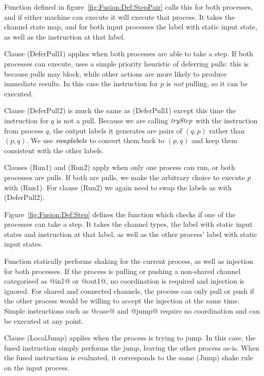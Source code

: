 

Function  defined in figure~\ref{fig:Fusion:Def:StepPair} calls this for both processes, and if either machine can execute it will execute that process.
It takes the channel state map, and for both input processes the label with static input state, as well as the instruction at that label.

Clause (DeferPull1) applies when both processes are able to take a step.
If both processes can execute,  uses a simple priority heuristic of deferring pulls: this is because pulls may block, while other actions are more likely to produce immediate results.
In this case the instruction for $p$ is \emph{not} pulling, so it can be executed.

Clause (DeferPull2) is much the same as (DeferPull1) except this time the instruction for $q$ is not a pull.
Because we are calling $\textit{tryStep}$ with the instruction from process $q$, the output labels it generates are pairs of $(q,p)$ rather than $(p,q)$.
We use $\textit{swaplabels}$ to convert them back to $(p,q)$ and keep them consistent with the other labels.

Clauses (Run1) and (Run2) apply when only one process can run, or both processes are pulls.
If both are pulls, we make the arbitrary choice to execute $p$ with (Run1).
For clause (Run2) we again need to swap the labels as with (DeferPull2).



Figure~\ref{fig:Fusion:Def:Step} defines the  function which checks if one of the processes can take a step.
It takes the channel types, the label with static input states and instruction at that label, as well as the other process' label with static input states.

Function  statically performs shaking for the current process, as well as injection for both processes.
If the process is pulling or pushing a non-shared channel categorised as @in1@ or @out1@, no coordination is required and injection is ignored.
For shared and connected channels, the process can only pull or push if the other process would be willing to accept the injection at the same time.
Simple instructions such as @case@ and @jump@ require no coordination and can be executed at any point.

Clause (LocalJump) applies when the process is trying to jump.
In this case, the fused instruction simply performs the jump, leaving the other process as-is.
When the fused instruction is evaluated, it corresponds to the same (Jump) shake rule on the input process.

